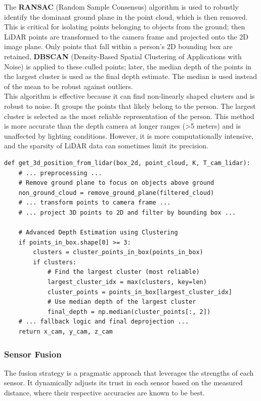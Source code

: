 \documentclass[11pt, a4paper]{article}
\begin{document}
The \textbf{RANSAC} (Random Sample Consensus) algorithm is used to robustly identify the dominant ground plane in the point cloud, which is then removed. This is critical for isolating points belonging to objects from the ground; then LiDAR points are transformed to the camera frame and projected onto the 2D image plane. Only points that fall within a person's 2D bounding box are retained, \textbf{DBSCAN} (Density-Based Spatial Clustering of Applications with Noise) is applied to these culled points; later, the median depth of the points in the largest cluster is used as the final depth estimate. The median is used instead of the mean to be robust against outliers.\\

This algorithm is effective because it can find non-linearly shaped clusters and is robust to noise. It groups the points that likely belong to the person. The largest cluster is selected as the most reliable representation of the person. This method is more accurate than the depth camera at longer ranges (\textgreater 5 meters) and is unaffected by lighting conditions. However, it is more computationally intensive, and the sparsity of LiDAR data can sometimes limit its precision.

\begin{lstlisting}[caption={Key steps in the LiDAR localization pipeline from lidar\_utils.py}, label={lst:lidar\_loc}]
def get_3d_position_from_lidar(box_2d, point_cloud, K, T_cam_lidar):
    # ... preprocessing ...
    # Remove ground plane to focus on objects above ground
    non_ground_cloud = remove_ground_plane(filtered_cloud)
    # ... transform points to camera frame ...
    # ... project 3D points to 2D and filter by bounding box ...
    
    # Advanced Depth Estimation using Clustering
    if points_in_box.shape[0] >= 3:
        clusters = cluster_points_in_box(points_in_box)
        if clusters:
            # Find the largest cluster (most reliable)
            largest_cluster_idx = max(clusters, key=len)
            cluster_points = points_in_box[largest_cluster_idx]
            # Use median depth of the largest cluster
            final_depth = np.median(cluster_points[:, 2])
    # ... fallback logic and final deprojection ...
    return x_cam, y_cam, z_cam
\end{lstlisting}

\subsubsection{Sensor Fusion}
The fusion strategy is a pragmatic approach that leverages the strengths of each sensor. It dynamically adjusts its trust in each sensor based on the measured distance, where their respective accuracies are known to be best.\\
\end{document}

